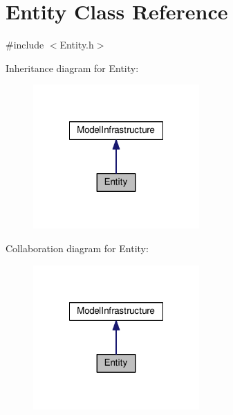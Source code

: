 \hypertarget{class_entity}{\section{Entity Class Reference}
\label{class_entity}
}


{\ttfamily \#include $<$Entity.\-h$>$}



Inheritance diagram for Entity\-:\nopagebreak
\begin{figure}[H]
\begin{center}
\leavevmode
\includegraphics[width=180pt]{class_entity__inherit__graph}
\end{center}
\end{figure}


Collaboration diagram for Entity\-:\nopagebreak
\begin{figure}[H]
\begin{center}
\leavevmode
\includegraphics[width=180pt]{class_entity__coll__graph}
\end{center}
\end{figure}
